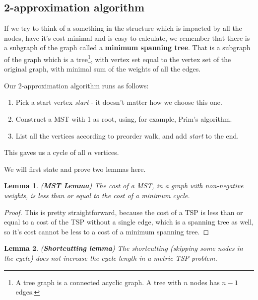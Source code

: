 \documentclass[12pt,twoside,notitlepage]{report}
\newtheorem{lemma}{Lemma}
\begin{document}
\subsection{2-approximation algorithm}

If we try to think of a something in the structure which is impacted by all the nodes, have it's cost minimal and is easy to calculate, we remember that there is a subgraph of the graph called a {\bf minimum spanning tree}. That is a subgraph of the graph which is a tree\footnote{A tree graph is a connected acyclic graph. A tree with $n$ nodes has $n - 1$ edges.}, with vertex set equal to the vertex set of the original graph, with minimal sum of the weights of all the edges.

\smallskip

Our 2-approximation algorithm runs as follows: 

\begin{enumerate}

\item Pick a start vertex {\it start} - it doesn't matter how we choose this one.
\item Construct a MST with 1 as root, using, for example, Prim's algorithm.
\item List all the vertices according to preorder walk, and add {\it start} to the end.

\end{enumerate}

This gaves us a cycle of all $n$ vertices.

\smallskip

We will first state and prove two lemmas here.

\begin{lemma}

\label{mstlemma} ({\bf MST Lemma})
The cost of a MST, in a graph with non-negative weights, is less than or equal to the cost of a minimum cycle.

\end{lemma}

\begin{proof}

This is pretty straightforward, because the cost of a TSP is less than or equal to a cost of the TSP without a single edge, which is a spanning tree as well, so it's cost cannot be less to a cost of a minimum spanning tree.

\end{proof}

\begin{lemma}

\label{shortcutting} ({\bf Shortcutting lemma})
The shortcutting (skipping some nodes in the cycle) does not increase the cycle length in a metric TSP problem.

\end{lemma}
\end{document}

